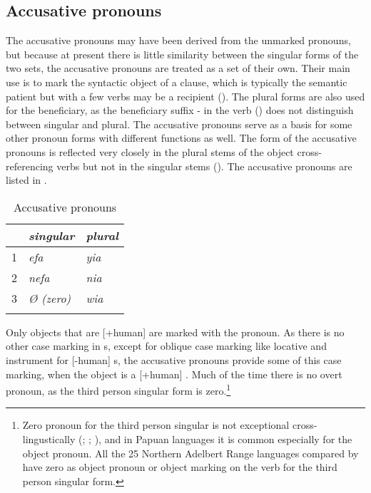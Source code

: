 \subsection{Accusative pronouns}\label{sec:3.5.3}
{}
The accusative pronouns may have been derived from the unmarked pronouns, but because at present there is little similarity between the singular forms of the two sets, the accusative pronouns are treated as a set of their own. Their main use is to mark the syntactic object of a clause, which is typically the semantic patient but with a few verbs may be a recipient (). The plural forms are also used for the beneficiary, as the beneficiary suffix - in the verb () does not distinguish between singular and plural. The accusative pronouns serve as a basis for some other pronoun forms with different functions as well. The form of the accusative pronouns is reflected very closely in the plural stems of the object cross-referencing verbs but not in the singular stems (). The accusative pronouns are listed in .

\begin{table}
\caption{Accusative pronouns}
\label{tab:3:accpron}
 
\begin{tabular}{l>{\itshape}l>{\itshape}l}
\mytoprule
 &\upshape singular &\upshape plural\\
\midrule
1 &efa &yia\\
2 &nefa &nia\\
3 &{\O} (zero) &wia\\
\mybottomrule
\end{tabular}
\end{table}


Only objects that are [+human] are marked with the pronoun. As there is no other case marking in s, except for oblique case marking like locative and instrument for [\nobreakdash-human] s, the accusative pronouns provide some of this case marking, when the object is a [+human] . Much of the time there is no overt pronoun, as the third person singular form is zero.\footnote{Zero pronoun for the third person singular is not exceptional cross-lingustically (\citealt[278]{Lyons1968}; \citealt[66]{Foley1986}; \citealt[166]{Givon1976}), and in Papuan languages it is common especially for the object pronoun. All the 25 Northern Adelbert Range languages compared by \citet[9,160]{ZGraggen1980} have zero as object pronoun or object marking on the verb for the third person singular form.} 

